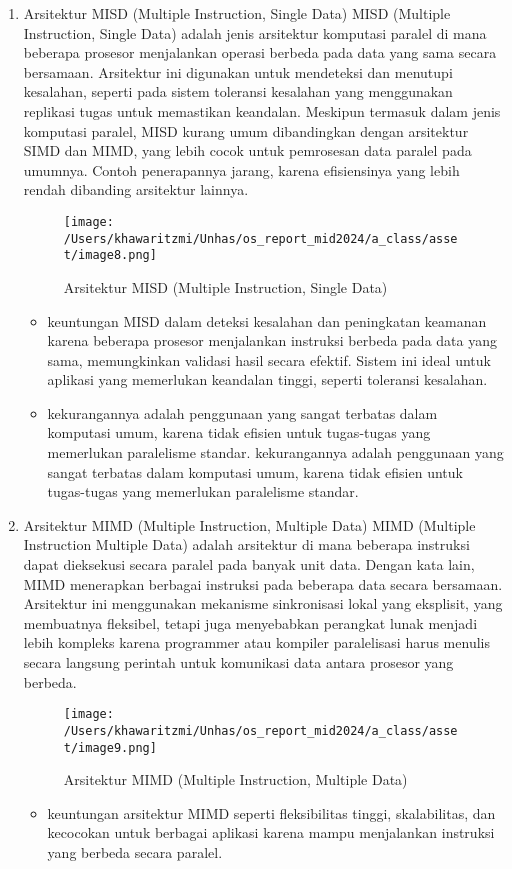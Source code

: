 \documentclass[12pt]{article}
\begin{document}
\begin{enumerate}
    \item Arsitektur MISD (Multiple Instruction, Single Data)
    MISD (Multiple Instruction, Single Data) adalah jenis arsitektur komputasi paralel di mana beberapa prosesor menjalankan operasi berbeda pada data yang sama secara bersamaan. Arsitektur ini digunakan untuk mendeteksi dan menutupi kesalahan, seperti pada sistem toleransi kesalahan yang menggunakan replikasi tugas untuk memastikan keandalan. Meskipun termasuk dalam jenis komputasi paralel, MISD kurang umum dibandingkan dengan arsitektur SIMD dan MIMD, yang lebih cocok untuk pemrosesan data paralel pada umumnya. Contoh penerapannya jarang, karena efisiensinya yang lebih rendah dibanding arsitektur lainnya.
    \begin{figure}[h]
        \centering
        \texttt{[image: /Users/khawaritzmi/Unhas/os\_report\_mid2024/a\_class/asset/image8.png]}  %
        \caption{Arsitektur MISD (Multiple Instruction, Single Data)}
        \label{fig:contoh_gambar}
    \end{figure}
    \begin{itemize}
        \item keuntungan MISD dalam deteksi kesalahan dan peningkatan keamanan karena beberapa prosesor menjalankan instruksi berbeda pada data yang sama, memungkinkan validasi hasil secara efektif. Sistem ini ideal untuk aplikasi yang memerlukan keandalan tinggi, seperti toleransi kesalahan.
        \item kekurangannya adalah penggunaan yang sangat terbatas dalam komputasi umum, karena tidak efisien untuk tugas-tugas yang memerlukan paralelisme standar. kekurangannya adalah penggunaan yang sangat terbatas dalam komputasi umum, karena tidak efisien untuk tugas-tugas yang memerlukan paralelisme standar. 
    \end{itemize}
    \item Arsitektur MIMD (Multiple Instruction, Multiple Data)
    MIMD (Multiple Instruction Multiple Data) adalah arsitektur di mana beberapa instruksi dapat dieksekusi secara paralel pada banyak unit data. Dengan kata lain, MIMD menerapkan berbagai instruksi pada beberapa data secara bersamaan. Arsitektur ini menggunakan mekanisme sinkronisasi lokal yang eksplisit, yang membuatnya fleksibel, tetapi juga menyebabkan perangkat lunak menjadi lebih kompleks karena programmer atau kompiler paralelisasi harus menulis secara langsung perintah untuk komunikasi data antara prosesor yang berbeda.
    \begin{figure}[h]
        \centering
        \texttt{[image: /Users/khawaritzmi/Unhas/os\_report\_mid2024/a\_class/asset/image9.png]}  %
        \caption{Arsitektur MIMD (Multiple Instruction, Multiple Data)}
        \label{fig:contoh_gambar}
    \end{figure}
    \begin{itemize}
        \item keuntungan arsitektur MIMD seperti fleksibilitas tinggi, skalabilitas, dan kecocokan untuk berbagai aplikasi karena mampu menjalankan instruksi yang berbeda secara paralel.


\end{itemize}
\end{enumerate}
\end{document}
